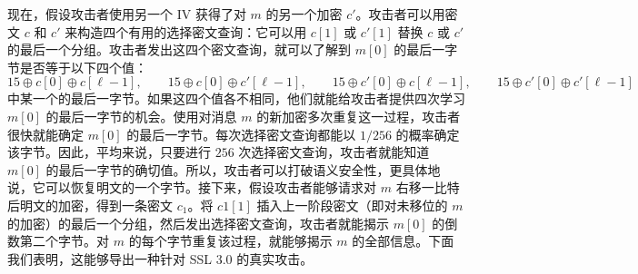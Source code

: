 \begin{snote}[选择密文攻击。]
现在，假设攻击者使用另一个 IV 获得了对 $m$ 的另一个加密 $c'$。攻击者可以用密文 $c$ 和 $c'$ 来构造四个有用的选择密文查询：它可以用 $c[1]$ 或 $c'[1]$ 替换 $c$ 或 $c'$ 的最后一个分组。攻击者发出这四个密文查询，就可以了解到 $m[0]$ 的最后一字节是否等于以下四个值：
\[
15\oplus c[0]\oplus c[\ell-1],\qquad
15\oplus c[0]\oplus c'[\ell-1],\qquad
15\oplus c'[0]\oplus c[\ell-1],\qquad
15\oplus c'[0]\oplus c'[\ell-1]
\]
中某一个的最后一字节。如果这四个值各不相同，他们就能给攻击者提供四次学习 $m[0]$ 的最后一字节的机会。使用对消息 $m$ 的新加密多次重复这一过程，攻击者很快就能确定 $m[0]$ 的最后一字节。每次选择密文查询都能以 $1/256$ 的概率确定该字节。因此，平均来说，只要进行 $256$ 次选择密文查询，攻击者就能知道 $m[0]$ 的最后一字节的确切值。所以，攻击者可以打破语义安全性，更具体地说，它可以恢复明文的一个字节。接下来，假设攻击者能够请求对 $m$ 右移一比特后明文的加密，得到一条密文 $c_1$。将 $c1[1]$ 插入上一阶段密文（即对未移位的 $m$ 的加密）的最后一个分组，然后发出选择密文查询，攻击者就能揭示 $m[0]$ 的倒数第二个字节。对 $m$ 的每个字节重复该过程，就能够揭示 $m$ 的全部信息。下面我们表明，这能够导出一种针对 SSL 3.0 的真实攻击。
\end{snote}

